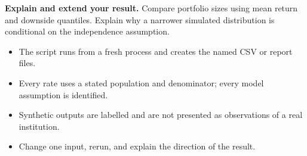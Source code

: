 \begin{verification}
\textbf{Explain and extend your result.} Compare portfolio sizes using mean return and downside quantiles. Explain why a narrower simulated distribution is conditional on the independence assumption.

\begin{itemize}\item The script runs from a fresh process and creates the named CSV or report files.\item Every rate uses a stated population and denominator; every model assumption is identified.\item Synthetic outputs are labelled and are not presented as observations of a real institution.\item Change one input, rerun, and explain the direction of the result.\end{itemize}\end{verification}

